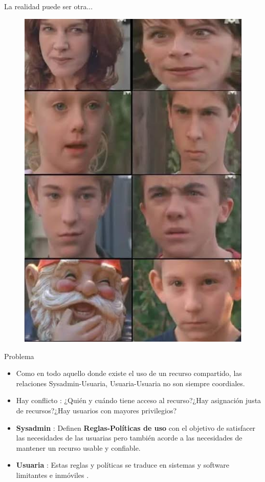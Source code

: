 \documentclass[11pt]{beamer}
\begin{document}
\begin{frame}{La realidad puede ser otra...}
	\begin{figure}
		\includegraphics[scale=0.3]{images/realidad}
	\end{figure}
\end{frame}


\begin{frame}{Problema}

	\begin{itemize}
		\item Como en todo aquello donde existe el uso de un recurso compartido, las relaciones Sysadmin-Usuaria, Usuaria-Usuaria no son siempre coordiales. 
		\item Hay conflicto : ¿Quién y cuándo tiene acceso al recurso?¿Hay asignación justa de recursos?¿Hay usuarios con mayores privilegios?
		\item \textbf{Sysadmin} : Definen \textbf{Reglas-Políticas de uso} con el objetivo de satisfacer las necesidades de las usuarias pero también acorde a las necesidades de mantener un recurso usable y confiable.
		\item \textbf{Usuaria} : Estas reglas y políticas se traduce en sistemas y software limitantes e inmóviles \citep{kurtzer2017singularity}. 
	\end{itemize}

\end{frame}
\end{document}

